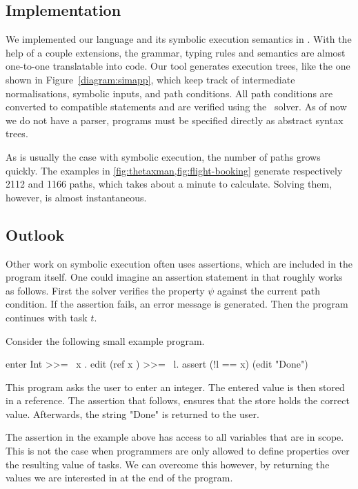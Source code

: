 \subsection{Implementation}

We implemented our language and its symbolic execution semantics in \HASKELL.
With the help of a couple \GHC extensions, the grammar, typing rules and semantics are almost one-to-one translatable into code.
Our tool generates execution trees, like the one shown in Figure~\ref{diagram:simapp},
which keep track of intermediate normalisations, symbolic inputs, and path conditions.
All path conditions are converted to \SMTLIB compatible statements and are verified using the \ZTHREE \SMT~solver.
As of now we do not have a parser, programs must be specified directly as abstract syntax trees.

As is usually the case with symbolic execution, the number of paths grows quickly.
The examples in \cref{fig:thetaxman,fig:flight-booking} generate respectively 2112 and 1166 paths,
which takes about a minute to calculate.
Solving them, however, is almost instantaneous.



\subsection{Outlook}
\label{subsec:outlook}

Other work on symbolic execution often uses assertions, which are included in the program itself.
One could imagine an assertion statement  in \TOPHAT that roughly works as follows.
First the \SAT solver verifies the property $\psi$ against the current path condition.
If the assertion fails, an error message is generated.
Then the program continues with task $t$.

\begin{example}
  Consider the following small example program.
  \begin{TASK}
    enter Int >>= \ x . edit (ref x ) >>= \ l. assert (!l == x) (edit "Done")
  \end{TASK}

  This program asks the user to enter an integer.
  The entered value is then stored in a reference.
  The assertion that follows, ensures that the store holds the correct value.
  Afterwards, the string "Done" is returned to the user.
\end{example}

The assertion in the example above has access to all variables that are in scope.
This is not the case when programmers are only allowed to define properties over the resulting value of tasks.
We can overcome this however, by returning the values we are interested in at the end of the program.

